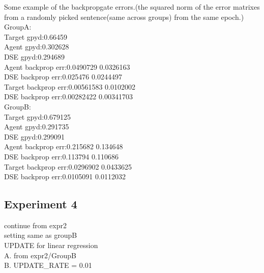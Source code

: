 \documentclass[a4paper, 12pt]{article}
\begin{document}
Some example of the backpropgate errors.(the squared norm of the error
matrixes from a randomly picked sentence(same across groups) from the same epoch.)\\
GroupA:\\
Target gpyd:0.66459\\
Agent gpyd:0.302628\\
DSE gpyd:0.294689\\
Agent backprop err:0.0490729 0.0326163\\
DSE backprop err:0.025476 0.0244497\\
Target backprop err:0.00561583 0.0102002\\
DSE backprop err:0.00282422 0.00341703\\
GroupB:\\
Target gpyd:0.679125\\
Agent gpyd:0.291735\\
DSE gpyd:0.299091\\
Agent backprop err:0.215682 0.134648\\
DSE backprop err:0.113794 0.110686\\
Target backprop err:0.0296902 0.0433625\\
DSE backprop err:0.0105091 0.0112032\\

\subsection{Experiment 4}
continue from expr2\\
setting same as groupB\\
UPDATE for linear regression\\
A. from expr2/GroupB\\
B. UPDATE\_RATE = 0.01\\
\end{document}
